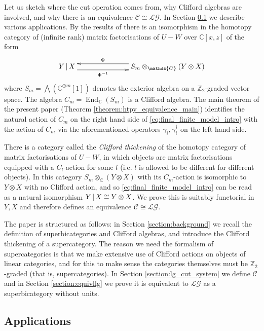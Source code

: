 \documentclass[english,letter paper,12pt,leqno]{article}
\theoremstyle{example}
\numberwithin{equation}{section}
\def\LG{\mathcal{LG}}
\def\nZ{\mathds{Z}}
\def\nC{\mathds{C}}
\def\L{\mathcal{C}}
\def\ferm{\gamma}
\def\fermc{\gamma^\dagger}
\DeclareMathOperator{\End}{End}
\begin{document}
Let us sketch where the cut operation comes from, why Clifford algebras are involved, and why there is an equivalence $\L \cong \LG$. In Section \ref{section:intro_appli} we describe various applications. By the results of \cite{dm1102.2957} there is an isomorphism in the homotopy category of (infinite rank) matrix factorisations of $U - W$ over $\nC[x,z]$ of the form
\begin{equation}\label{eq:final_finite_model_intro}
\xymatrix@C+4pc{
Y \l X \ar@<-1ex>[r]_-{\Phi^{-1}} & S_m \otimes_{\nC} ( Y \otimes X )\ar@<-1ex>[l]_-{\Phi}
}
\end{equation}
where $S_m = \bigwedge ( \nC^{\oplus m}[1] )$ denotes the exterior algebra on a $\nZ_2$-graded vector space. The algebra $C_m = \End_{\nC}(S_m)$ is a Clifford algebra. The main theorem of the present paper (Theorem \ref{theorem:htpy_equivalence_main}) identifies the natural action of $C_m$ on the right hand side of \eqref{eq:final_finite_model_intro} with the action of $C_m$ via the aforementioned operators $\ferm_i, \fermc_i$ on the left hand side.

There is a category called the \emph{Clifford thickening} of the homotopy category of matrix factorisations of $U - W$, in which objects are matrix factorisations equipped with a $C_l$-action for some $l$ (i.e. $l$ is allowed to be different for different objects). In this category $S_m \otimes_{\nC} ( Y \otimes X )$ with its $C_m$-action is isomorphic to $Y \otimes X$ with no Clifford action, and so \eqref{eq:final_finite_model_intro} can be read as a natural isomorphism $Y \,|\, X \cong Y \otimes X$. We prove this is suitably functorial in $Y,X$ and therefore defines an equivalence $\L \cong \LG$.

\vspace{0.5cm}

The paper is structured as follows: in Section \ref{section:background} we recall the definition of superbicategories and Clifford algebras, and introduce the Clifford thickening of a supercategory. The reason we need the formalism of supercategories is that we make extensive use of Clifford actions on objects of linear categories, and for this to make sense the categories themselves must be $\nZ_2$-graded (that is, supercategories). In Section \ref{section:lg_cut_system} we define $\L$ and in Section \ref{section:equivllg} we prove it is equivalent to $\LG$ as a superbicategory without units. 

\subsection{Applications}\label{section:intro_appli}
\end{document}
